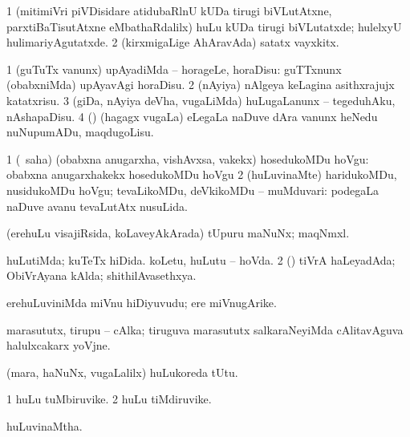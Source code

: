 {{{{{{\begin{center}
\noindent
\gl{\pagu}
\expl{}
\bmng
\bnum
\num{1}  (mitimiVri piVDisidare atidubaRlnU kUDa tirugi biVLutAtxne, parxtiBaTisutAtxne eMbathaRdalilx) huLu kUDa tirugi biVLutatxde; hulelxyU hulimariyAgutatxde. 
\num{2}  (kirxmigaLige AhAravAda) satatx vayxkitx. 
\enum
\emng
\eentry

\bentry
{} 
\gl{\sakirx}
\expl{}
\bmng
\bnum
\num{1} (guTuTx \mo vanunx) upAyadiMda -- horageLe, horaDisu:  guTTxnunx (obabxniMda) upAyavAgi horaDisu. 
\num{2} (nAyiya) nAlgeya keLagina asithxrajujx katatxrisu. 
\num{3} (giDa, nAyiya deVha, \mo vugaLiMda) huLugaLanunx -- tegeduhAku, nAshapaDisu. 
\num{4} (\nw) (hagagx \mo vugaLa) eLegaLa naDuve dAra \mo vanunx heNedu nuNupumADu, maqdugoLisu. 
\enum
\emng

\noindent
\gl{\akirx}
\expl{}
\bmng
\bnum
\num{1} (\AtAmx\ saha) (obabxna anugarxha, vishAvxsa, \mo vakekx) hosedukoMDu hoVgu:  obabxna anugarxhakekx hosedukoMDu hoVgu 
\num{2} (huLuvinaMte) haridukoMDu, nusidukoMDu hoVgu; tevaLikoMDu, deVkikoMDu -- muMduvari:  podegaLa naDuve avanu tevaLutAtx nusuLida. 
\enum
\emng
\eentry

\bentry
{} 
\gl{\nA}
\expl{}
\bmng
(erehuLu visajiRsida, koLaveyAkArada) tUpuru maNuNx; maqNmxl. 
\emng
\eentry

\bentry
{} 
\gl{\gu}
\expl{}
\bmng
\bnum
{} 
\banum
{} huLutiMda; kuTeTx hiDida. 
 koLetu, huLutu -- hoVda. 
\eanum
\numie
\num{2} (\rUpa) tiVrA haLeyadAda; ObiVrAyana kAlda; shithilAvasethxya. 
\enum
\emng
\eentry

\bentry
{} 
\gl{\nA}
\expl{}
\bmng
erehuLuviniMda miVnu hiDiyuvudu; ere miVnugArike. 
\emng
\eentry

\bentry
{} 
\gl{\nA}
\expl{}
\bmng
marasututx, tirupu -- cAlka; tiruguva marasututx salkaraNeyiMda cAlitavAguva halulxcakarx yoVjne. 
\emng
\eentry

\bentry
{} 
\gl{\nA}
\expl{}
\bmng
(mara, haNuNx, \mo vugaLalilx) huLukoreda tUtu. 
\emng
\eentry

\bentry
{} 
\gl{\nA}
\expl{}
\bmng
\bnum
\num{1} huLu tuMbiruvike. 
\num{2} huLu tiMdiruvike. 
\enum
\emng
\eentry

\bentry
{} 
\gl{\gu}
\expl{}
\bmng
huLuvinaMtha. 
\emng
\eentry


\end{center}}}}}}}
